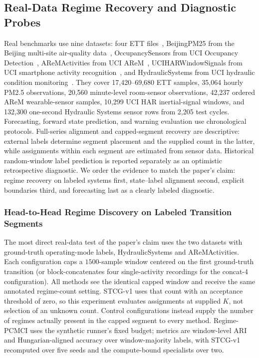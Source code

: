 \documentclass[sigconf,anonymous]{acmart}
\begin{document}
\subsection{Real-Data Regime Recovery and Diagnostic Probes}
\label{sec:exp-real}

Real benchmarks use nine datasets: four ETT files~\cite{zhou2021informer}, BeijingPM25 from the Beijing multi-site air-quality data~\cite{zhang2017cautionary}, OccupancySensors from UCI Occupancy Detection~\cite{candanedo2016occupancydata,candanedo2016accurate}, AReMActivities from UCI AReM~\cite{palumbo2016arem}, UCIHARWindowSignals from UCI smartphone activity recognition~\cite{reyesortiz2012har}, and HydraulicSystems from UCI hydraulic condition monitoring~\cite{helwig2018hydraulic}.
They cover 17,420--69,680 ETT samples, 35,064 hourly PM2.5 observations, 20,560 minute-level room-sensor observations, 42,237 ordered AReM wearable-sensor samples, 10,299 UCI HAR inertial-signal windows, and 132,300 one-second Hydraulic Systems sensor rows from 2,205 test cycles.
Forecasting, forward state prediction, and warning evaluation use chronological protocols. Full-series alignment and capped-segment recovery are descriptive: external labels determine segment placement and the supplied count in the latter, while assignments within each segment are estimated from sensor data. Historical random-window label prediction is reported separately as an optimistic retrospective diagnostic.
We order the evidence to match the paper's claim: regime recovery on labeled systems first, state--label alignment second, explicit boundaries third, and forecasting last as a clearly labeled diagnostic.

\subsubsection{Head-to-Head Regime Discovery on Labeled Transition Segments}
\label{sec:exp-real-headtohead}

The most direct real-data test of the paper's claim uses the two datasets with ground-truth operating-mode labels, HydraulicSystems and AReMActivities.
Each configuration caps a $1500$-sample window centered on the first ground-truth transition (or block-concatenates four single-activity recordings for the concat-4 configuration). All methods see the identical capped window and receive the same annotated regime-count setting. STCG-v1 uses that count with an acceptance threshold of zero, so this experiment evaluates assignments at supplied $K$, not selection of an unknown count. Control configurations instead supply the number of regimes actually present in the capped segment to every method.
Regime-PCMCI uses the synthetic runner's fixed budget; metrics are window-level ARI and Hungarian-aligned accuracy over window-majority labels, with STCG-v1 recomputed over five seeds and the compute-bound specialists over two.
\end{document}
